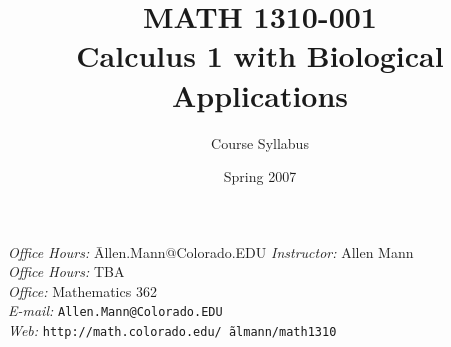 \documentclass[11pt]{article}
\title{MATH 1310-001 \\ Calculus 1 with Biological Applications}
\author{Course Syllabus}
\date{Spring 2007}
\newcommand{\url}[1]{\texttt{#1}}
\begin{document}
\maketitle



\begin{tabbing}
\textit{Office Hours:} \quad   \= Allen.Mann@Colorado.EDU   \kill
\textit{Instructor:}		\> Allen Mann \\
\textit{Office Hours:}    	\> TBA \\
\textit{Office:}			\> Mathematics 362 \\
\textit{E-mail:}			\> \url{Allen.Mann@Colorado.EDU} \\
\textit{Web:}			\> \url{http://math.colorado.edu/\~\,$\!$almann/math1310}
\end{tabbing}
\end{document}
